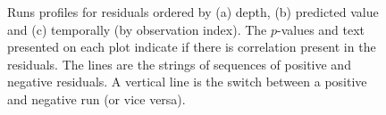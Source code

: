 \begin{frame}[fragile]
\begin{figure}[h]
  \centering
  \hfill
  \hfill
  \hfill
\caption{Runs profiles for residuals ordered by (a) depth, (b) predicted value and (c) temporally (by observation index). The $p$-values and text presented on each plot indicate if there is correlation present in the residuals.  The lines are the strings of sequences of positive and negative residuals.  A vertical line is the switch between a positive and negative run (or vice versa).}
\label{fig:runs1}
\end{figure}
\end{frame}

